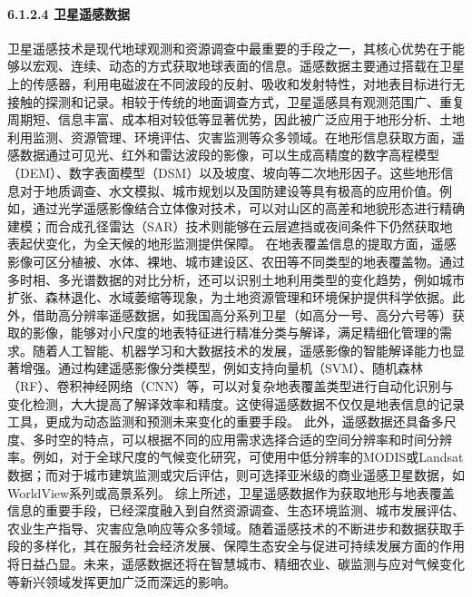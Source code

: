 {\paragraph{6.1.2.4 卫星遥感数据}\label{ux536bux661fux9065ux611fux6570ux636e}
卫星遥感技术是现代地球观测和资源调查中最重要的手段之一，其核心优势在于能够以宏观、连续、动态的方式获取地球表面的信息。遥感数据主要通过搭载在卫星上的传感器，利用电磁波在不同波段的反射、吸收和发射特性，对地表目标进行无接触的探测和记录。相较于传统的地面调查方式，卫星遥感具有观测范围广、重复周期短、信息丰富、成本相对较低等显著优势，因此被广泛应用于地形分析、土地利用监测、资源管理、环境评估、灾害监测等众多领域。在地形信息获取方面，遥感数据通过可见光、红外和雷达波段的影像，可以生成高精度的数字高程模型（DEM）、数字表面模型（DSM）以及坡度、坡向等二次地形因子。这些地形信息对于地质调查、水文模拟、城市规划以及国防建设等具有极高的应用价值。例如，通过光学遥感影像结合立体像对技术，可以对山区的高差和地貌形态进行精确建模；而合成孔径雷达（SAR）技术则能够在云层遮挡或夜间条件下仍然获取地表起伏变化，为全天候的地形监测提供保障。
在地表覆盖信息的提取方面，遥感影像可区分植被、水体、裸地、城市建设区、农田等不同类型的地表覆盖物。通过多时相、多光谱数据的对比分析，还可以识别土地利用类型的变化趋势，例如城市扩张、森林退化、水域萎缩等现象，为土地资源管理和环境保护提供科学依据。此外，借助高分辨率遥感数据，如我国高分系列卫星（如高分一号、高分六号等）获取的影像，能够对小尺度的地表特征进行精准分类与解译，满足精细化管理的需求。随着人工智能、机器学习和大数据技术的发展，遥感影像的智能解译能力也显著增强。通过构建遥感影像分类模型，例如支持向量机（SVM）、随机森林（RF）、卷积神经网络（CNN）等，可以对复杂地表覆盖类型进行自动化识别与变化检测，大大提高了解译效率和精度。这使得遥感数据不仅仅是地表信息的记录工具，更成为动态监测和预测未来变化的重要手段。
此外，遥感数据还具备多尺度、多时空的特点，可以根据不同的应用需求选择合适的空间分辨率和时间分辨率。例如，对于全球尺度的气候变化研究，可使用中低分辨率的MODIS或Landsat数据；而对于城市建筑监测或灾后评估，则可选择亚米级的商业遥感卫星数据，如WorldView系列或高景系列。
综上所述，卫星遥感数据作为获取地形与地表覆盖信息的重要手段，已经深度融入到自然资源调查、生态环境监测、城市发展评估、农业生产指导、灾害应急响应等众多领域。随着遥感技术的不断进步和数据获取手段的多样化，其在服务社会经济发展、保障生态安全与促进可持续发展方面的作用将日益凸显。未来，遥感数据还将在智慧城市、精细农业、碳监测与应对气候变化等新兴领域发挥更加广泛而深远的影响。
}
